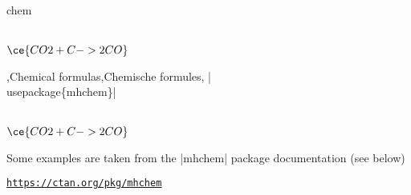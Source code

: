 
\begin{saveblock}{chem}
	\begin{highlightblock}[gobble=8,linewidth=\textwidth,
		framexleftmargin=0.25em,xleftmargin=0.25em]
		\\
		$\ce{CO2 + C -> 2 CO}$\\
	\end{highlightblock}
\end{saveblock}

\begin{frame}
	{\lang,Chemical formulas,Chemische formules, \hll|\\usepackage\{mhchem\}|}

	\medskip

	\\
	$\ce{CO2 + C -> 2 CO}$\\

	{\small Some examples are taken from the \hll|mhchem| package documentation (see below)}


	\begin{center}
		\par
		\href{https://ctan.org/pkg/mhchem}{\ul{\texttt{https://ctan.org/pkg/mhchem}}}
	\end{center}

\end{frame}
